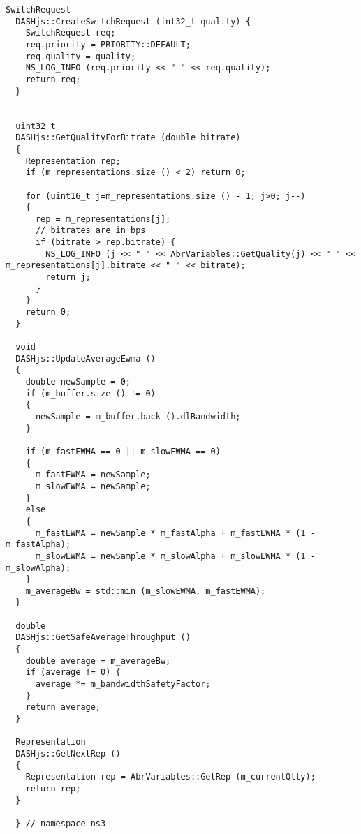 \begin{lstlisting}[language=myC++, caption={DASHjs.cc}, captionpos=b]
  SwitchRequest
  DASHjs::CreateSwitchRequest (int32_t quality) {
    SwitchRequest req;
    req.priority = PRIORITY::DEFAULT;
    req.quality = quality;
    NS_LOG_INFO (req.priority << " " << req.quality);
    return req;
  }
  
  
  uint32_t
  DASHjs::GetQualityForBitrate (double bitrate)
  {
    Representation rep;
    if (m_representations.size () < 2) return 0;
  
    for (uint16_t j=m_representations.size () - 1; j>0; j--)
    {
      rep = m_representations[j];
      // bitrates are in bps
      if (bitrate > rep.bitrate) {
        NS_LOG_INFO (j << " " << AbrVariables::GetQuality(j) << " " << m_representations[j].bitrate << " " << bitrate);
        return j;
      }
    }
    return 0;
  }
  
  void
  DASHjs::UpdateAverageEwma ()
  {
    double newSample = 0;
    if (m_buffer.size () != 0)
    {
      newSample = m_buffer.back ().dlBandwidth;
    }
  
    if (m_fastEWMA == 0 || m_slowEWMA == 0)
    {
      m_fastEWMA = newSample;
      m_slowEWMA = newSample;
    }
    else
    {
      m_fastEWMA = newSample * m_fastAlpha + m_fastEWMA * (1 - m_fastAlpha);
      m_slowEWMA = newSample * m_slowAlpha + m_slowEWMA * (1 - m_slowAlpha);
    }
    m_averageBw = std::min (m_slowEWMA, m_fastEWMA);
  }
  
  double
  DASHjs::GetSafeAverageThroughput ()
  {
    double average = m_averageBw;
    if (average != 0) {
      average *= m_bandwidthSafetyFactor;
    }
    return average;
  }
  
  Representation
  DASHjs::GetNextRep ()
  {
    Representation rep = AbrVariables::GetRep (m_currentQlty);
    return rep;
  }
  
  } // namespace ns3
  
\end{lstlisting}
